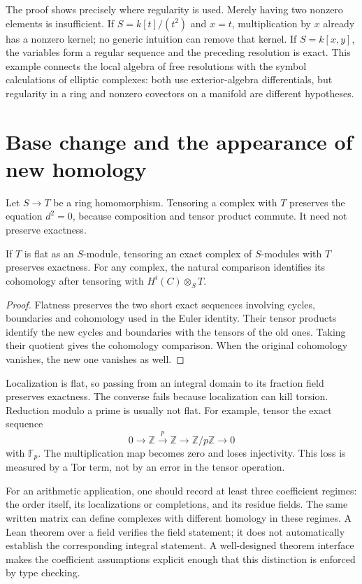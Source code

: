 The proof shows precisely where regularity is used. Merely having two nonzero elements is insufficient. If $S=k[t]/(t^2)$ and $x=t$, multiplication by $x$ already has a nonzero kernel; no generic intuition can remove that kernel. If $S=k[x,y]$, the variables form a regular sequence and the preceding resolution is exact. This example connects the local algebra of free resolutions with the symbol calculations of elliptic complexes: both use exterior-algebra differentials, but regularity in a ring and nonzero covectors on a manifold are different hypotheses.

\section{Base change and the appearance of new homology}

Let $S\to T$ be a ring homomorphism. Tensoring a complex with $T$ preserves the equation $d^2=0$, because composition and tensor product commute. It need not preserve exactness.

\begin{proposition}
If $T$ is flat as an $S$-module, tensoring an exact complex of $S$-modules with $T$ preserves exactness. For any complex, the natural comparison identifies its cohomology after tensoring with $H^i(C)\otimes_ST$.
\end{proposition}
\begin{proof}
Flatness preserves the two short exact sequences involving cycles, boundaries and cohomology used in the Euler identity. Their tensor products identify the new cycles and boundaries with the tensors of the old ones. Taking their quotient gives the cohomology comparison. When the original cohomology vanishes, the new one vanishes as well.
\end{proof}

Localization is flat, so passing from an integral domain to its fraction field preserves exactness. The converse fails because localization can kill torsion. Reduction modulo a prime is usually not flat. For example, tensor the exact sequence
\[
0\to\mathbb Z\xrightarrow{\,p\,}\mathbb Z
 \to\mathbb Z/p\mathbb Z\to0
\]
with $\mathbb F_p$. The multiplication map becomes zero and loses injectivity. This loss is measured by a Tor term, not by an error in the tensor operation.

For an arithmetic application, one should record at least three coefficient regimes: the order itself, its localizations or completions, and its residue fields. The same written matrix can define complexes with different homology in these regimes. A Lean theorem over a field verifies the field statement; it does not automatically establish the corresponding integral statement. A well-designed theorem interface makes the coefficient assumptions explicit enough that this distinction is enforced by type checking.

